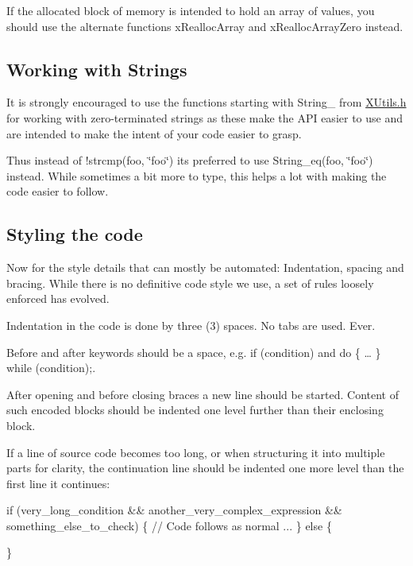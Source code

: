 If the allocated block of memory is intended to hold an array of values, you should use the alternate functions {\ttfamily x\+Realloc\+Array} and {\ttfamily x\+Realloc\+Array\+Zero} instead.

\subsection*{Working with Strings }

It is strongly encouraged to use the functions starting with {\ttfamily String\+\_\+} from {\ttfamily \hyperlink{XUtils_8h}{X\+Utils.\+h}} for working with zero-\/terminated strings as these make the A\+PI easier to use and are intended to make the intent of your code easier to grasp.

Thus instead of {\ttfamily !strcmp(foo, \char`\"{}foo\char`\"{})} it\textquotesingle{}s preferred to use {\ttfamily String\+\_\+eq(foo, \char`\"{}foo\char`\"{})} instead. While sometimes a bit more to type, this helps a lot with making the code easier to follow.

\subsection*{Styling the code }

Now for the style details that can mostly be automated\+: Indentation, spacing and bracing. While there is no definitive code style we use, a set of rules loosely enforced has evolved.

Indentation in the code is done by three (3) spaces. No tabs are used. Ever.

Before and after keywords should be a space, e.\+g. {\ttfamily if (condition)} and {\ttfamily do \{ … \} while (condition);}.

After opening and before closing braces a new line should be started. Content of such encoded blocks should be indented one level further than their enclosing block.

If a line of source code becomes too long, or when structuring it into multiple parts for clarity, the continuation line should be indented one more level than the first line it continues\+:


\begin{DoxyCode}
\textcolor{keywordflow}{if} (very\_long\_condition &&
   another\_very\_complex\_expression &&
   something\_else\_to\_check) \{
   \textcolor{comment}{// Code follows as normal ...}
\} \textcolor{keywordflow}{else} \{

\}
\end{DoxyCode}


